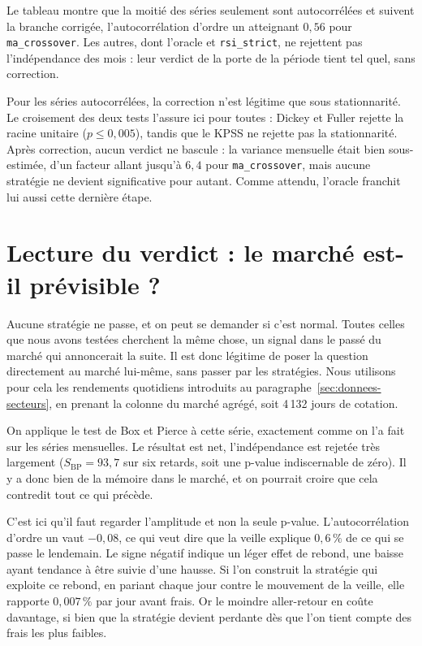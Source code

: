 Le tableau montre que la moitié des séries seulement sont autocorrélées et
suivent la branche corrigée, l'autocorrélation d'ordre un atteignant $0{,}56$
pour \texttt{ma\_crossover}. Les autres, dont l'oracle et \texttt{rsi\_strict},
ne rejettent pas l'indépendance des mois : leur verdict de la porte de la
période tient tel quel, sans correction.

Pour les séries autocorrélées, la correction n'est légitime que sous
stationnarité. Le croisement des deux tests l'assure ici pour toutes : Dickey
et Fuller rejette la racine unitaire ($p \le 0{,}005$), tandis que le KPSS ne
rejette pas la stationnarité. Après correction, aucun verdict ne bascule : la
variance mensuelle était bien sous-estimée, d'un facteur allant jusqu'à
$6{,}4$ pour \texttt{ma\_crossover}, mais aucune stratégie ne devient
significative pour autant. Comme attendu, l'oracle franchit lui aussi cette
dernière étape.



\section{Lecture du verdict : le marché est-il prévisible ?}
\label{sec:b1-efficience}

Aucune stratégie ne passe, et on peut se demander si c'est normal. Toutes
celles que nous avons testées cherchent la même chose, un signal dans le passé
du marché qui annoncerait la suite. Il est donc légitime de poser la question
directement au marché lui-même, sans passer par les stratégies. Nous
utilisons pour cela les rendements quotidiens introduits au
paragraphe~\ref{sec:donnees-secteurs}, en prenant la colonne du marché
agrégé, soit 4\,132 jours de cotation.

On applique le test de Box et Pierce à cette série, exactement comme on l'a
fait sur les séries mensuelles. Le résultat est net, l'indépendance est
rejetée très largement ($S_{\mathrm{BP}} = 93{,}7$ sur six retards, soit une
p-value indiscernable de zéro). Il y a donc bien de la mémoire dans le marché,
et on pourrait croire que cela contredit tout ce qui précède.

C'est ici qu'il faut regarder l'amplitude et non la seule p-value.
L'autocorrélation d'ordre un vaut $-0{,}08$, ce qui veut dire que la veille
explique $0{,}6\,\%$ de ce qui se passe le lendemain. Le signe négatif indique
un léger effet de rebond, une baisse ayant tendance à être suivie d'une
hausse. Si l'on construit la stratégie qui exploite ce rebond, en pariant
chaque jour contre le mouvement de la veille, elle rapporte $0{,}007\,\%$ par
jour avant frais. Or le moindre aller-retour en coûte davantage, si bien que
la stratégie devient perdante dès que l'on tient compte des frais les plus
faibles.

